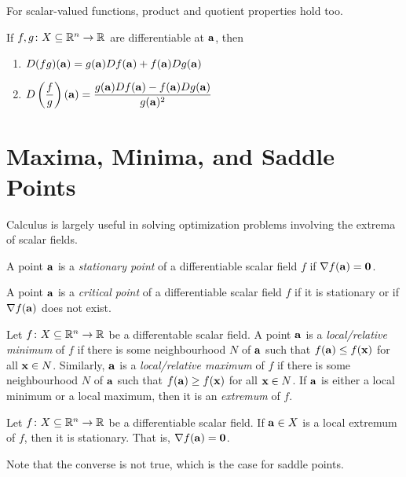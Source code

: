 \documentclass{article}
\begin{document}
For scalar-valued functions, product and quotient properties hold too.

\begin{theorem}
  If $f, g \colon X \subseteq \mathbb{R}^n \to \mathbb{R}$ are differentiable at $\mathbf{a}$, then
  \begin{enumerate}
    \item $D(fg)(\mathbf{a}) = g(\mathbf{a})Df(\mathbf{a}) + f(\mathbf{a})Dg(\mathbf{a})$
    \item $D\left( \dfrac{f}{g} \right)(\mathbf{a}) = \dfrac{g(\mathbf{a})Df(\mathbf{a}) - f(\mathbf{a})Dg(\mathbf{a})}{g(\mathbf{a})^2}$
  \end{enumerate}
\end{theorem}

\section{Maxima, Minima, and Saddle Points}

Calculus is largely useful in solving optimization problems involving the extrema of scalar fields.

\begin{definition}
  A point $\mathbf{a}$ is a \emph{stationary point} of a differentiable scalar field $f$ if $\nabla f(\mathbf{a}) = \mathbf{0}$.
\end{definition}

\begin{definition}
  A point $\mathbf{a}$ is a \emph{critical point} of a differentiable scalar field $f$ if it is stationary or if $\nabla f(\mathbf{a})$ does not exist.
\end{definition}

\begin{definition}[Extrema]
  Let $f \colon X \subseteq \mathbb{R}^n \to \mathbb{R}$ be a differentable scalar field.
  A point $\mathbf{a}$ is a \emph{local/relative minimum} of $f$ if there is some neighbourhood $N$ of $\mathbf{a}$ such that $f(\mathbf{a}) \leq f(\mathbf{x})$ for all $\mathbf{x} \in N$.
  Similarly, $\mathbf{a}$ is a \emph{local/relative maximum} of $f$ if there is some neighbourhood $N$ of $\mathbf{a}$ such that $f(\mathbf{a}) \geq f(\mathbf{x})$ for all $\mathbf{x} \in N$.
  If $\mathbf{a}$ is either a local minimum or a local maximum, then it is an \emph{extremum} of $f$.
\end{definition}

\begin{theorem}
  Let $f \colon X \subseteq \mathbb{R}^n \to \mathbb{R}$ be a differentiable scalar field.
  If $\mathbf{a} \in X$ is a local extremum of $f$, then it is stationary.
  That is, $\nabla f(\mathbf{a}) = \mathbf{0}$.
\end{theorem}
Note that the converse is not true, which is the case for saddle points.
\end{document}
